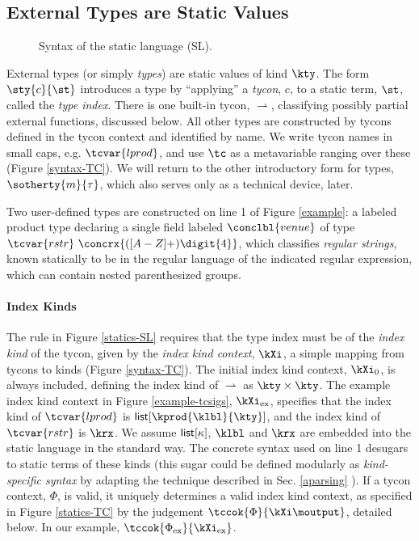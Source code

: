 \subsection{External Types are Static Values}
\begin{figure}[t!]
\small
\hspace{-4px}
\caption{Syntax of the static language (SL).}
\label{syntax-SL}
\end{figure}

External types (or simply \emph{types}) are {static values} of kind $\kty$.  %
The form $\sty{c}{\st}$ introduces a type by ``applying'' a \emph{tycon}, $c$, to a static term, $\st$, called the \emph{type index}. There is one built-in tycon, $\rightharpoonup$, classifying possibly partial external functions, discussed below. All other types are constructed by tycons defined in the tycon context and identified by name. We write tycon names in small caps, e.g. $\tcvar{lprod}$, and use $\tc$ as a metavariable ranging over these (Figure \ref{syntax-TC}). We will return to the other introductory form for types, $\sotherty{m}{\tau}$, which also serves only as a technical device, later. 

Two user-defined types are constructed on line 1 of Figure \ref{example}: a labeled product type declaring a single field labeled $\conclbl{venue}$ of type $\tcvar{rstr}~\concrx{([A-Z]+) \digit\{4\}}$, which classifies \emph{regular strings}, known statically to be in the regular language of the indicated regular expression, which can contain nested parenthesized groups. %

\paragraph{Index Kinds} The rule  in Figure \ref{statics-SL} requires that the type index must be of the \emph{index kind} of the tycon, given by the \emph{index kind context}, $\kXi$, a simple mapping from tycons to kinds (Figure \ref{syntax-TC}). The initial index kind context, $\kXi_0$, is always included, defining the index kind of ${\rightharpoonup}$ as $\kty \times \kty$. 
The example index kind context in Figure \ref{example-tcsigs}, $\kXi_\text{ex}$, specifies that the index kind of $\tcvar{lprod}$ is $\klist{\kprod{\klbl}{\kty}}$, and the  index kind of $\tcvar{rstr}$ is $\krx$. We assume $\textsf{list}[\kappa]$, $\klbl$ and $\krx$ are embedded into the static language in the standard way. The concrete syntax used on line 1 desugars to static terms of these kinds (this sugar could be defined modularly as \emph{kind-specific syntax} by adapting the technique described in Sec. \ref{aparsing} \cite{TSLs}). If a tycon context, $\Phi$, is valid, it  uniquely determines a valid index kind context, as specified  in Figure \ref{statics-TC} by the judgement $\tccok{\Phi}{\kXi\moutput}$, detailed below. In our example, $\tccok{\Phi_\text{ex}}{\kXi_\text{ex}}$. 


